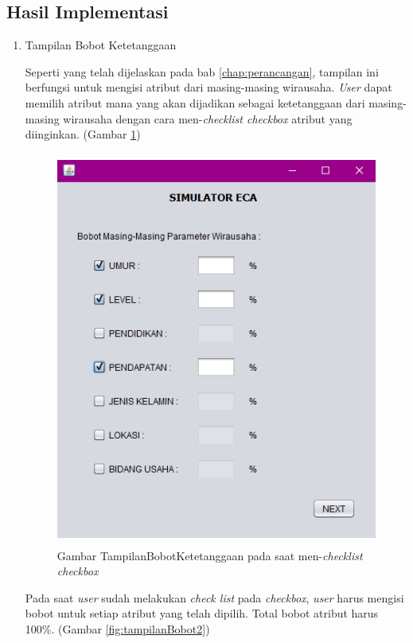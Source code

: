 \subsection{Hasil Implementasi}
\begin{enumerate}
	\item Tampilan Bobot Ketetanggaan
	
	
	Seperti yang telah dijelaskan pada bab \ref{chap:perancangan}, tampilan ini berfungsi untuk mengisi atribut dari masing-masing wirausaha. \textit{User} dapat memilih atribut mana yang akan dijadikan sebagai ketetanggaan dari masing-masing wirausaha dengan cara men-\textit{checklist checkbox} atribut yang diinginkan. (Gambar \ref{fig:tampilanBobot1})
	
	
	\begin{figure} [H]
	\centering  
	\includegraphics[width=12cm, height=13cm]{tampilanImplementasiBobot} 
		\caption[Gambar TampilanBobotKetetanggaan]{Gambar TampilanBobotKetetanggaan pada saat men-\textit{checklist checkbox}}
	\label{fig:tampilanBobot1} 
\end{figure}

	Pada saat \textit{user} sudah melakukan \textit{check list} pada \textit{checkbox}, \textit{user} harus mengisi bobot untuk setiap atribut yang telah dipilih. Total bobot atribut harus 100\%. (Gambar \ref{fig:tampilanBobot2})
	

\end{enumerate}
